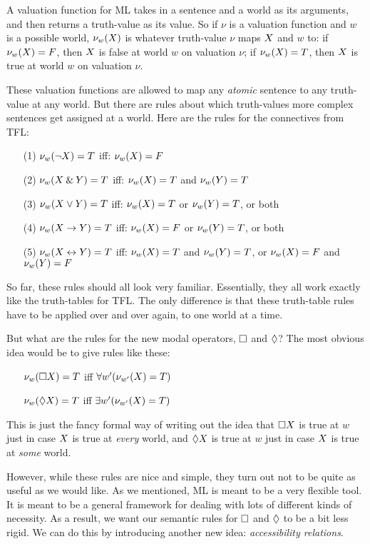 A valuation function for ML takes in a sentence and a world as its arguments, and then returns a truth-value as its value. So if $\nu$ is a valuation function and $w$ is a possible world, $\nu_w(X)$ is whatever truth-value $\nu$ maps $X$ and $w$ to: if $\nu_w(X)=F$, then $X$ is false at world $w$ on valuation $\nu$; if $\nu_w(X)=T$, then $X$ is true at world $w$ on valuation $\nu$.

These valuation functions are allowed to map any \emph{atomic} sentence to any truth-value at any world. But there are rules about which truth-values more complex sentences get assigned at a world. Here are the rules for the connectives from TFL:
\begin{itemize}
	\item[(1)]$\nu_w(\neg X)=T$ iff: $\nu_w(X)=F$
	\item[(2)]$\nu_w(X\mathbin{\&}Y)=T$ iff: $\nu_w(X)=T$ and $\nu_w(Y)=T$
	\item[(3)]$\nu_w(X\vee Y)=T$ iff: $\nu_w(X)=T$ or $\nu_w(Y)=T$, or both
	\item[(4)]$\nu_w(X\rightarrow Y)=T$ iff: $\nu_w(X)=F$ or $\nu_w(Y)=T$, or both
	\item[(5)]$\nu_w(X\leftrightarrow Y)=T$ iff: $\nu_w(X)=T$ and $\nu_w(Y)=T$, or $\nu_w(X)=F$ and $\nu_w(Y)=F$
\end{itemize}
So far, these rules should all look very familiar. Essentially, they all work exactly like the truth-tables for TFL. The only difference is that these truth-table rules have to be applied over and over again, to one world at a time.

But what are the rules for the new modal operators, $\Box$ and $\Diamond$? The most obvious idea would be to give rules like these:
\begin{itemize}
	\item[]$\nu_w(\Box X)=T$ iff $\forall w' (\nu_{w'}(X)=T)$
	\item[]$\nu_w(\Diamond X)=T$ iff $\exists w' (\nu_{w'}(X)=T)$
\end{itemize}
This is just the fancy formal way of writing out the idea that $\Box X$ is true at $w$ just in case $X$ is true at \emph{every} world, and $\Diamond X$ is true at $w$ just in case $X$ is true at \emph{some} world.

However, while these rules are nice and simple, they turn out not to be quite as useful as we would like. As we mentioned, ML is meant to be a very flexible tool. It is meant to be a general framework for dealing with lots of different kinds of necessity. As a result, we want our semantic rules for $\Box$ and $\Diamond$ to be a bit less rigid. We can do this by introducing another new idea: \emph{accessibility relations}.

